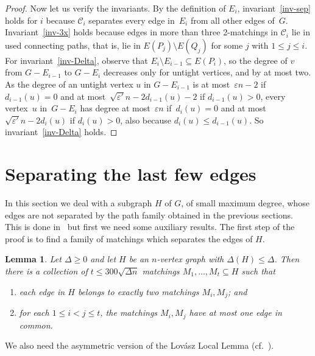 \documentclass[a4paper, 11pt,reqno]{amsart}
\newcommand{\calC}{\mathcal{C}}
\theoremstyle{plain}
\newtheorem{lemma}[theorem]{Lemma}
\theoremstyle{definition}
\numberwithin{equation}{section}
\newcommand{\eps}{\varepsilon}
\begin{document}
\begin{proof}
  Now let us verify the invariants.
  By the definition of $E_i$, invariant~\ref{inv-sep} holds for $i$ 
  because $\calC_i$ separates every edge in~$E_i$ from all other edges of~$G$.
  Invariant~\ref{inv-3x} holds because edges in more than three 2-matchings in $\calC_i$ lie 
  in used connecting paths, that is, lie in $E(P_j) \setminus E(Q_j)$ for some $j$ with $1 \leq j \leq i$.
  For invariant~\ref{inv-Delta}, observe that $E_{i} \setminus E_{i-1} \subseteq E(P_i)$, 
  so the degree of $v$ from $G-E_{i-1}$ to $G-E_i$ decreases only for untight vertices, 
  and by at most two.  As the degree of an untight vertex $u$ in $G-E_{i-1}$ is at 
  most~$\eps n - 2$ if $d_{i-1}(u) = 0$ and at most~$\sqrt{\eps'}n - 2d_{i-1}(u) - 2$ 
  if $d_{i-1}(u) > 0$, every vertex~$u$ in~$G-E_i$ has degree at most~$\eps n$ if~$d_i(u) = 0$
  and at most $\sqrt{\eps'}n - 2d_i(u)$ if $d_i(u) > 0$, also because $d_i(u) \leq d_{i-1}(u)$.
  So invariant~\ref{inv-Delta} holds.
\end{proof}

\section{Separating the last few edges} \label{sec:separating}

In this section we deal with a subgraph $H$ of $G$, of small maximum degree, 
whose edges are not separated by the path family obtained in the previous sections.
This is done in~ but first we need some auxiliary results.
The first step of the proof is to find a family of matchings which separates the edges of $H$.

\begin{lemma} \label{lemma:separatingmatchings}
Let $\Delta \geq 0$ and let $H$ be an $n$-vertex
graph with $\Delta(H) \leq \Delta$. Then there is a collection
of $t \leq 300 \sqrt{\Delta n}$ matchings $M_1, \dotsc, M_t \subseteq H$ such that
\begin{enumerate}[\upshape{\textbf{(M\arabic*)}},labelindent=0pt,labelwidth=\widthof{\ref{item:Mlast}},leftmargin=!]
	\item each edge in $H$ belongs to exactly two matchings $M_i, M_j$; and\label{item:Mtwo}
	\item for each $1 \leq i < j \leq t$, the matchings $M_i, M_j$ have
	at most one edge in common.\label{item:Mlast}
\end{enumerate}
\end{lemma}

We also need the asymmetric version of the Lovász Local Lemma
(cf.~\cite[Theorem~1.1]{Spencer1977}).
\end{document}
